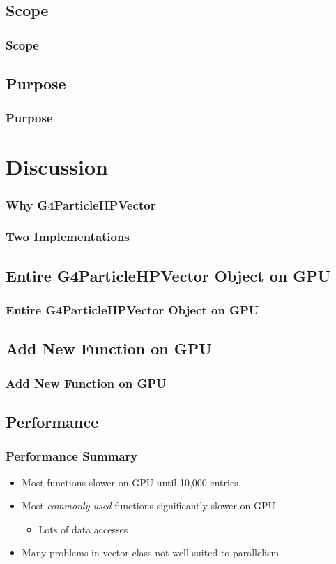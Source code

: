 \documentclass{beamer}
\newcommand{\textapprox}{\raisebox{0.5ex}{\texttildelow}}
\begin{document}
\subsection{Scope}
\begin{frame}
\frametitle{Scope}
\end{frame}

\subsection{Purpose}
\begin{frame}
\frametitle{Purpose}
\end{frame}

\section{Discussion}

\begin{frame}
\frametitle{Why G4ParticleHPVector}
\end{frame}

\begin{frame}
\frametitle{Two Implementations}
\end{frame}

\subsection{Entire G4ParticleHPVector Object on GPU}
\begin{frame}
\frametitle{Entire G4ParticleHPVector Object on GPU}
\end{frame}

\subsection{Add New Function on GPU}
\begin{frame}
\frametitle{Add New Function on GPU}
\end{frame}

\subsection{Performance}
\begin{frame}
\frametitle{Performance Summary}
\begin{itemize}
\item Most functions slower on GPU until \textapprox 10,000 entries 
\item Most \emph{commonly-used} functions significantly slower on GPU
\begin{itemize}
\item Lots of data accesses
\end{itemize}
\item Many problems in vector class not well-suited to parallelism
\end{itemize}
\end{frame}
\end{document}
